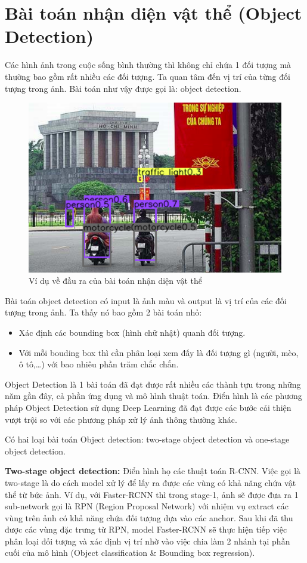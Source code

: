 \documentclass[a4paper, 12pt]{report}
\begin{document}
\section{Bài toán nhận diện vật thể (Object Detection)}
Các hình ảnh trong cuộc sống bình thường thì không chỉ chứa 1 đối tượng mà thường bao gồm rất nhiều các đối tượng. Ta quan tâm đến vị trí của từng đối tượng trong ảnh. Bài toán như vậy được gọi là: object detection.\par
\begin{figure}[!h]
	\centering
	\includegraphics[width=0.7\linewidth]{Images/det}
	\caption{Ví dụ về đầu ra của bài toán nhận diện vật thể}
	\label{fig:det}
\end{figure}
Bài toán object detection có input là ảnh màu và output là vị trí của các đối tượng trong ảnh. Ta thấy nó bao gồm 2 bài toán nhỏ:
\begin{itemize}
	\item Xác định các bounding box (hình chữ nhật) quanh đối tượng.
	\item Với mỗi bouding box thì cần phân loại xem đấy là đối tượng gì (người, mèo, ô tô,…) với bao nhiêu phần trăm chắc chắn.
\end{itemize}
Object Detection là 1 bài toán đã đạt được rất nhiều các thành tựu trong những năm gần đây, cả phần ứng dụng và mô hình thuật toán. Điển hình là các phương pháp Object Detection sử dụng Deep Learning đã đạt được các bước cải thiện vượt trội so với các phương pháp xử lý ảnh thông thường khác.\par
Có hai loại bài toán Object detection: two-stage object detection và one-stage object detection.\par
\textbf{Two-stage object detection:} Điển hình họ các thuật toán R-CNN. Việc gọi là two-stage là do cách model xử lý để lấy ra được các vùng có khả năng chứa vật thể từ bức ảnh. Ví dụ, với Faster-RCNN thì trong stage-1, ảnh sẽ được đưa ra 1 sub-network gọi là RPN (Region Proposal Network) với nhiệm vụ extract các vùng trên ảnh có khả năng chứa đối tượng dựa vào các anchor. Sau khi đã thu được các vùng đặc trưng từ RPN, model Faster-RCNN sẽ thực hiện tiếp việc phân loại đối tượng và xác định vị trí nhờ vào việc chia làm 2 nhánh tại phần cuối của mô hình (Object classification \& Bounding box regression).\par
\end{document}
